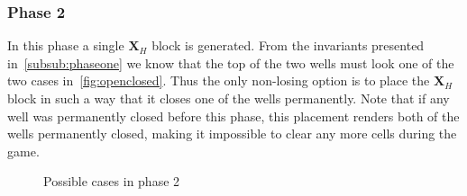 \subsubsection{Phase 2}
\label{subsub:phase2}

In this phase a single $\mathbf{X}_H$ block is generated. From the invariants presented in~\ref{subsub:phaseone} we know that the top of the two wells must look one of the two cases in~\autoref{fig:openclosed}. Thus the only non-losing option is to place the $\mathbf{X}_H$ block in such a way that it closes one of the wells permanently. Note that if any well was permanently closed before this phase, this placement renders both of the wells permanently closed, making it impossible to clear any more cells during the game.

\begin{figure}[H]
    \centering
    \begin{subfigure}[b]{0.35\textwidth}
        \caption{}
    \end{subfigure}
    \hspace{0.05\textwidth}
    \begin{subfigure}[b]{0.35\textwidth}
        \caption{}
    \end{subfigure}

    \begin{subfigure}[b]{0.35\textwidth}
        \caption{}
    \end{subfigure}

    \caption{Possible cases in phase 2}
    \label{fig:placement}
\end{figure}
